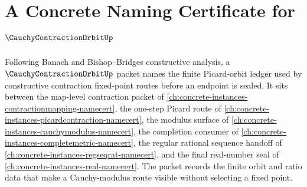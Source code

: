 \chapter{A Concrete Naming Certificate for $\CauchyContractionOrbitUp$}
\label{ch:concrete-instances-cauchy-contraction-orbit-namecert}

Following Banach and Bishop--Bridges constructive analysis, a $\CauchyContractionOrbitUp$ packet names the finite Picard-orbit ledger used by constructive contraction fixed-point routes before an endpoint is sealed. It sits between the map-level contraction packet of \autoref{ch:concrete-instances-contractionmapping-namecert}, the one-step Picard route of \autoref{ch:concrete-instances-picardcontraction-namecert}, the modulus surface of \autoref{ch:concrete-instances-cauchymodulus-namecert}, the completion consumer of \autoref{ch:concrete-instances-completemetric-namecert}, the regular rational sequence handoff of \autoref{ch:concrete-instances-regseqrat-namecert}, and the final real-number seal of \autoref{ch:concrete-instances-real-namecert}. The packet records the finite orbit and ratio data that make a Cauchy-modulus route visible without selecting a fixed point.

